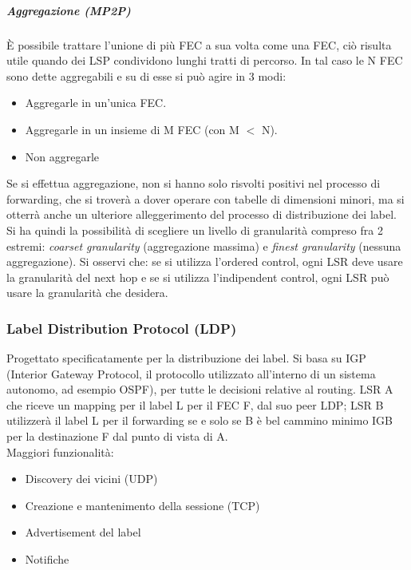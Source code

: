 \documentclass{article}
\begin{document}
\subparagraph{Aggregazione (MP2P)} È possibile trattare l'unione di più FEC a sua volta come una FEC, ciò risulta utile quando dei LSP condividono lunghi tratti di percorso. In tal caso le N FEC sono dette aggregabili e su di esse si può agire in 3 modi:
\begin{itemize}
    \item Aggregarle in un'unica FEC.
    \item Aggregarle in un insieme di M FEC (con M $<$ N).
    \item Non aggregarle
\end{itemize}
Se si effettua aggregazione, non si hanno solo risvolti positivi nel processo di forwarding, che si troverà a dover operare con tabelle di dimensioni minori, ma si otterrà anche un ulteriore alleggerimento del processo di distribuzione dei label. Si ha quindi la possibilità di scegliere un livello di granularità compreso fra 2 estremi: \textit{coarset granularity} (aggregazione massima) e \textit{finest granularity} (nessuna aggregazione). Si osservi che: se si utilizza l'ordered control, ogni LSR deve usare la granularità del next hop e se si utilizza l'indipendent control, ogni LSR può usare la granularità che desidera.

\subsubsection{Label Distribution Protocol (LDP)} 
Progettato specificatamente per la distribuzione dei label. Si basa su IGP (Interior Gateway Protocol, il protocollo utilizzato all'interno di un sistema autonomo, ad esempio OSPF), per tutte le decisioni relative al routing. LSR A che riceve un mapping per il label L per il FEC F, dal suo peer LDP; LSR B utilizzerà il label L per il forwarding se e solo se B è bel cammino minimo IGB per la destinazione F dal punto di vista di A. \\ Maggiori funzionalità:
\begin{itemize}
    \item Discovery dei vicini (UDP)
    \item Creazione e mantenimento della sessione (TCP)
    \item Advertisement del label
    \item Notifiche
\end{itemize}
\end{document}
